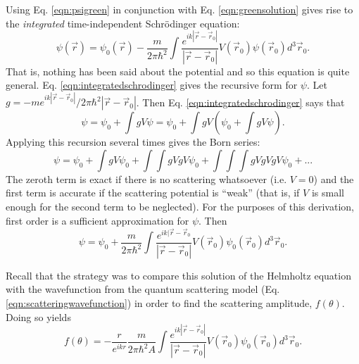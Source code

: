 Using Eq. \eqref{eqn:psigreen} in conjunction with Eq. \eqref{eqn:greensolution} gives rise to the \emph{integrated} time-independent Schr\"{o}dinger equation:
%
\begin{equation} \label{eqn:integratedschrodinger}
\psi(\vec{r})=\psi_0 (\vec{r})-\frac{m}{2\pi\hbar^2}\int\frac{e^{ik|\vec{r}-\vec{r}_0|}}{|\vec{r}-\vec{r}_0|}V(\vec{r}_0)\psi(\vec{r}_0)d^3\vec{r}_0.
\end{equation}
%
That is, nothing has been said about the potential and so this equation is quite general. Eq. \eqref{eqn:integratedschrodinger} gives the recursive form for $\psi$. Let $g=-me^{ik|\vec{r}-\vec{r}_0|}/2\pi\hbar^2|\vec{r}-\vec{r}_0|$. Then Eq. \eqref{eqn:integratedschrodinger} says that
%
\begin{equation} \nonumber
\psi=\psi_0+\int gV\psi = \psi_0+\int gV (\psi_0+\int gV\psi).
\end{equation}
%
Applying this recursion several times gives the Born series:
%
\begin{equation}\nonumber
\psi=\psi_0+\int gV\psi_0+\int \int gVgV\psi_0 + \int \int \int gVgVgV\psi_0 + ...
\end{equation}
%
The zeroth term is exact if there is no scattering whatsoever (i.e. $V=0$) and the first term is accurate if the scattering potential is ``weak'' (that is, if $V$ is small enough for the second term to be neglected). For the purposes of this derivation, first order is a sufficient approximation for $\psi$. Then
%
\begin{equation} \nonumber
\psi=\psi_0+\frac{m}{2\pi\hbar^2}\int\frac{e^{ik|\vec{r}-\vec{r}_0}}{|\vec{r}-\vec{r}_0|}V(\vec{r}_0)\psi_0(\vec{r}_0) d^3\vec{r}_0.
\end{equation}

Recall that the strategy was to compare this solution of the Helmholtz equation with the wavefunction from the quantum scattering model (Eq. \eqref{eqn:scatteringwavefunction}) in order to find the scattering amplitude, $f(\theta)$. Doing so yields
%
\begin{equation} \nonumber
f(\theta)=-\frac{r}{e^{ikr}}\frac{m}{2\pi\hbar^2A}\int\frac{e^{ik|\vec{r}-\vec{r}_0|}}{|\vec{r}-\vec{r}_0|}V(\vec{r}_0)\psi_0(\vec{r}_0)d^3\vec{r}_0.
\end{equation}
%

